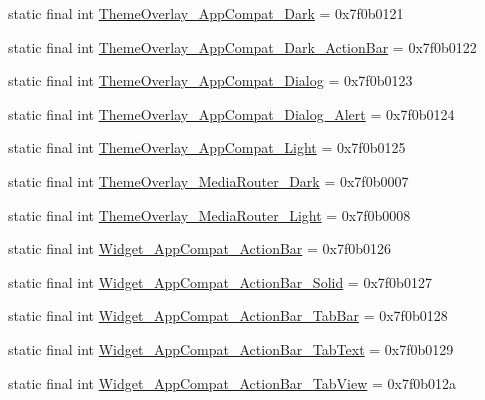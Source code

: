 \begin{CompactItemize}
\item 
static final int \hyperlink{classandroid_1_1support_1_1v7_1_1palette_1_1_r_1_1style_dc44ba62a64c5cfa81956e6a626beba5}{ThemeOverlay\_\-AppCompat\_\-Dark} = 0x7f0b0121
\item 
static final int \hyperlink{classandroid_1_1support_1_1v7_1_1palette_1_1_r_1_1style_70ebe67ff168a164c15e5cc35c2f7df7}{ThemeOverlay\_\-AppCompat\_\-Dark\_\-ActionBar} = 0x7f0b0122
\item 
static final int \hyperlink{classandroid_1_1support_1_1v7_1_1palette_1_1_r_1_1style_2d685f0fa8e828b382713565a394099a}{ThemeOverlay\_\-AppCompat\_\-Dialog} = 0x7f0b0123
\item 
static final int \hyperlink{classandroid_1_1support_1_1v7_1_1palette_1_1_r_1_1style_62ba0b17726adb885c8f7a174a5f2386}{ThemeOverlay\_\-AppCompat\_\-Dialog\_\-Alert} = 0x7f0b0124
\item 
static final int \hyperlink{classandroid_1_1support_1_1v7_1_1palette_1_1_r_1_1style_bed96f96ab03f1f3e5ad45a8148756cc}{ThemeOverlay\_\-AppCompat\_\-Light} = 0x7f0b0125
\item 
static final int \hyperlink{classandroid_1_1support_1_1v7_1_1palette_1_1_r_1_1style_7d6e1d399a4fedc34265a3f3bcc183f6}{ThemeOverlay\_\-MediaRouter\_\-Dark} = 0x7f0b0007
\item 
static final int \hyperlink{classandroid_1_1support_1_1v7_1_1palette_1_1_r_1_1style_199421d69793ec82d6076baf7e2a8cd4}{ThemeOverlay\_\-MediaRouter\_\-Light} = 0x7f0b0008
\item 
static final int \hyperlink{classandroid_1_1support_1_1v7_1_1palette_1_1_r_1_1style_c29601b85c91d590928d92abd02aea96}{Widget\_\-AppCompat\_\-ActionBar} = 0x7f0b0126
\item 
static final int \hyperlink{classandroid_1_1support_1_1v7_1_1palette_1_1_r_1_1style_7bfbc319554c0fe9343e247efd6e052e}{Widget\_\-AppCompat\_\-ActionBar\_\-Solid} = 0x7f0b0127
\item 
static final int \hyperlink{classandroid_1_1support_1_1v7_1_1palette_1_1_r_1_1style_6b68cee1bfdd094a2d7f7eb7e9b49324}{Widget\_\-AppCompat\_\-ActionBar\_\-TabBar} = 0x7f0b0128
\item 
static final int \hyperlink{classandroid_1_1support_1_1v7_1_1palette_1_1_r_1_1style_99cb2e72a03c7295f209f525975b7862}{Widget\_\-AppCompat\_\-ActionBar\_\-TabText} = 0x7f0b0129
\item 
static final int \hyperlink{classandroid_1_1support_1_1v7_1_1palette_1_1_r_1_1style_6b6ca18599d01935e7c5a476ee26ec43}{Widget\_\-AppCompat\_\-ActionBar\_\-TabView} = 0x7f0b012a

\end{CompactItemize}
